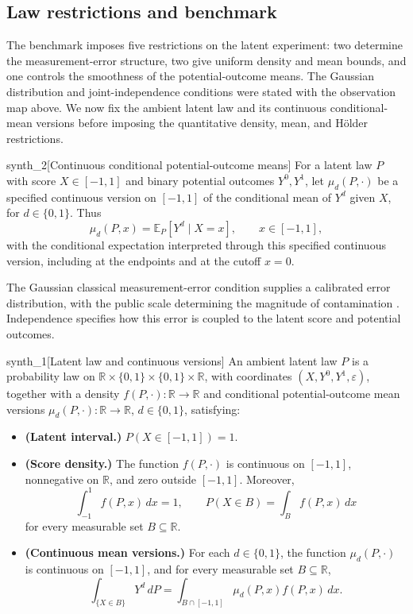 \documentclass[11pt]{article}
\begin{document}
\subsection{Law restrictions and benchmark}

The benchmark imposes five restrictions on the latent experiment: two determine the measurement-error structure, two give uniform density and mean bounds, and one controls the smoothness of the potential-outcome means. The Gaussian distribution and joint-independence conditions were stated with the observation map above. We now fix the ambient latent law and its continuous conditional-mean versions before imposing the quantitative density, mean, and Hölder restrictions.

\begin{definitionv}{synth_2}[Continuous conditional potential-outcome means]
For a latent law \(P\) with score \(X\in[-1,1]\) and binary potential outcomes \(Y^0,Y^1\), let \(\mu_d(P,\cdot)\) be a specified continuous version on \([-1,1]\) of the conditional mean of \(Y^d\) given \(X\), for \(d\in\{0,1\}\). Thus
\[
\mu_d(P,x)=\mathbb E_P[Y^d\mid X=x],
\qquad x\in[-1,1],
\]
with the conditional expectation interpreted through this specified continuous version, including at the endpoints and at the cutoff \(x=0\).
\end{definitionv}

The Gaussian classical measurement-error condition supplies a calibrated error distribution, with the public scale determining the magnitude of contamination \citep{PeiShen2017DevilTails}. Independence specifies how this error is coupled to the latent score and potential outcomes.

\begin{definitionv}{synth_1}[Latent law and continuous versions]
An ambient latent law \(P\) is a probability law on \(\mathbb R\times\{0,1\}\times\{0,1\}\times\mathbb R\), with coordinates \((X,Y^0,Y^1,\varepsilon)\), together with a density \(f(P,\cdot):\mathbb R\to\mathbb R\) and conditional potential-outcome mean versions \(\mu_d(P,\cdot):\mathbb R\to\mathbb R\), \(d\in\{0,1\}\), satisfying:
\begin{itemize}
\item \textbf{(Latent interval.)} \(P(X\in[-1,1])=1\).
\item \textbf{(Score density.)} The function \(f(P,\cdot)\) is continuous on \([-1,1]\), nonnegative on \(\mathbb R\), and zero outside \([-1,1]\). Moreover,
\[
\int_{-1}^{1} f(P,x)\,dx=1,
\qquad
P(X\in B)=\int_B f(P,x)\,dx
\]
for every measurable set \(B\subseteq\mathbb R\).
\item \textbf{(Continuous mean versions.)} For each \(d\in\{0,1\}\), the function \(\mu_d(P,\cdot)\) is continuous on \([-1,1]\), and for every measurable set \(B\subseteq\mathbb R\),
\[
\int_{\{X\in B\}} Y^d\,dP
=
\int_{B\cap[-1,1]} \mu_d(P,x)f(P,x)\,dx.
\]
\end{itemize}
\end{definitionv}
\end{document}
